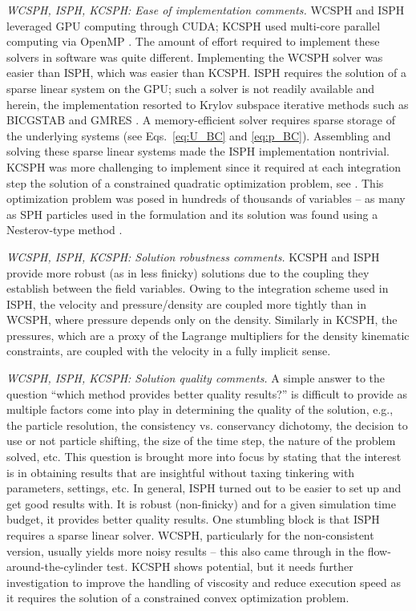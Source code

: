 \vspace{3pt}

\noindent \textit{WCSPH, ISPH, KCSPH: Ease of implementation comments.} WCSPH and ISPH leveraged GPU computing through CUDA; KCSPH used multi-core parallel computing via OpenMP \cite{openMP}. The amount of effort required to implement these solvers in software was quite different. Implementing the WCSPH solver was easier than ISPH, which was easier than KCSPH. ISPH requires the solution of a sparse linear system on the GPU; such a solver is not readily available and herein, the implementation resorted to Krylov subspace iterative methods such as BICGSTAB and GMRES \cite{saad1989overview}. A memory-efficient solver requires sparse storage of the underlying systems (see Eqs.~\ref{eq:U_BC} and \ref{eq:p_BC}). Assembling and solving these sparse linear systems made the ISPH implementation nontrivial. KCSPH was more challenging to implement since it required at each integration step the solution of a constrained quadratic optimization problem, see \cite{hammadConstrFluid2018}. This optimization problem was posed in hundreds of thousands of variables -- as many as SPH particles used in the formulation and its solution was found using a Nesterov-type method \cite{hammadTOG2015}. 

\vspace{3pt}

\noindent \textit{WCSPH, ISPH, KCSPH: Solution robustness comments.}
KCSPH and ISPH  provide more robust (as in less finicky) solutions due to the coupling they establish between the field variables. Owing to the integration scheme used in ISPH, the velocity and pressure/density are coupled more tightly than in WCSPH, where pressure depends only on the density. Similarly in KCSPH, the pressures, which are a proxy of the Lagrange multipliers for the density kinematic constraints, are coupled with the velocity in a fully implicit sense. 

\vspace{3pt}

\noindent \textit{WCSPH, ISPH, KCSPH: Solution quality comments.} A simple answer to the question ``which method provides better quality results?'' is difficult to provide as multiple factors come into play in determining the quality of the solution, e.g., the particle resolution, the consistency vs. conservancy dichotomy, the decision to use or not particle shifting, the size of the time step, the nature of the problem solved, etc. This question is brought more into focus by stating that the interest is in obtaining results that are insightful without taxing tinkering with parameters, settings, etc. In general, ISPH turned out to be easier to set up and get good results with. It is robust (non-finicky) and for a given simulation time budget, it provides better quality results. One stumbling block is that ISPH requires a sparse linear solver. WCSPH, particularly for the non-consistent version, usually yields more noisy results -- this also came through in the flow-around-the-cylinder test. KCSPH shows potential, but it needs further investigation to improve the handling of viscosity and reduce execution speed as it requires the solution of a constrained convex optimization problem.

